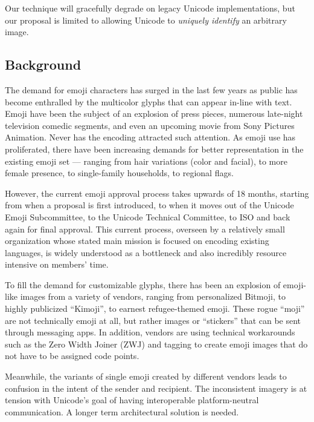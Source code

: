 \documentclass[12pt]{article}
\begin{document}
Our technique will gracefully degrade on legacy Unicode
implementations, but our proposal is limited to allowing Unicode to
\emph{uniquely identify} an arbitrary image.


  \subsection{Background} 

The demand for emoji characters has surged in the last few years as public has become enthralled by the multicolor glyphs that can appear in-line with text. Emoji have been the subject of an explosion of press pieces, numerous late-night television comedic segments, and even an upcoming movie from Sony Pictures Animation. Never has the encoding attracted such attention.
As emoji use has proliferated, there have been increasing demands for better representation in the existing emoji set — ranging from hair variations (color and facial), to more female presence, to single-family households, to regional flags.\autocite{UTR52}

However, the current emoji approval process takes upwards of 18 months, starting from when a proposal is first introduced, to when it moves out of the Unicode Emoji Subcommittee, to the Unicode Technical Committee, to ISO and back again for final approval. This current process, overseen by a relatively small organization whose stated main mission is focused on encoding existing languages, is widely understood as a bottleneck and also incredibly resource intensive on members’ time.

To fill the demand for customizable glyphs, there has been an explosion of emoji-like images from a variety of vendors, ranging from personalized Bitmoji, to highly publicized “Kimoji”, to earnest refugee-themed emoji. These rogue “moji” are not technically emoji at all, but rather images or “stickers” that can be sent through messaging apps. In addition, vendors are using technical workarounds such as the Zero Width Joiner (ZWJ) and tagging to create emoji images that do not have to be assigned code points.

Meanwhile, the variants of single emoji created by different vendors leads to confusion in the intent of the sender and recipient.\autocite{EmojiVarying} The inconsistent imagery is at tension with Unicode’s goal of having interoperable platform-neutral communication. 
A longer term architectural solution is needed. 
\end{document}
